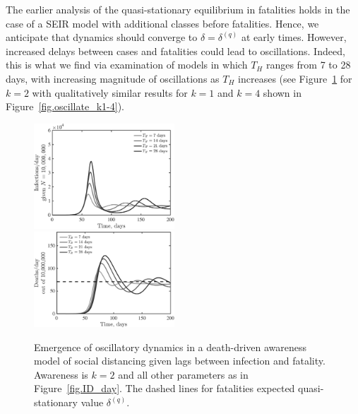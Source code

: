The earlier analysis of
the quasi-stationary equilibrium in fatalities holds in the
case of a SEIR model with additional classes before
fatalities. Hence,
we anticipate that dynamics should converge to $\delta=\delta^{(q)}$
at early times. However, increased delays between cases and
fatalities could lead to oscillations.  Indeed, this
is what we find via examination of models in which
$T_H$ ranges from 7 to 28 days, with increasing magnitude of
oscillations as $T_H$ increases (see Figure~\ref{fig.oscillate} 
for $k=2$ with qualitatively similar results for $k=1$ and
$k=4$ shown in Figure~\ref{fig.oscillate_k1-4}).

\begin{figure}[t!]
\begin{center}
\includegraphics[width=0.47\textwidth]{scripts/figseir_Hdel_k2_noname.pdf}\\
\includegraphics[width=0.47\textwidth]{scripts/figseir_Hdel_k2D_noname.pdf}
\caption{Emergence of oscillatory dynamics in a death-driven awareness
model of social distancing given lags between infection and fatality.
Awareness is $k=2$ and all other parameters as in Figure~\ref{fig.ID_day}.
The dashed
lines for fatalities expected quasi-stationary value $\delta^{(q)}$.
\label{fig.oscillate}}
\end{center}
\end{figure}

